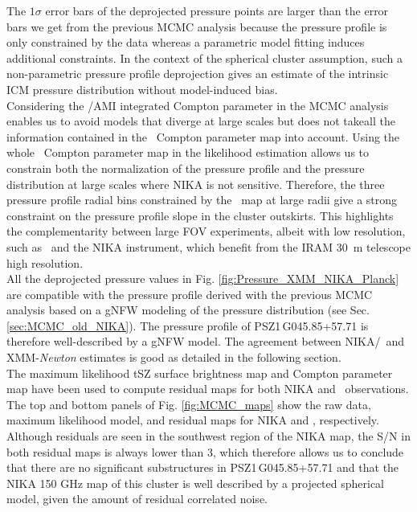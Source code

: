 \documentclass[traditabstract]{aa}
\begin{document}
\indent The $1\sigma$ error bars of the deprojected pressure points are larger than the error bars we get from the previous MCMC analysis because the pressure profile is only constrained by the data whereas a parametric model fitting induces additional constraints. In the context of the spherical cluster assumption, such a non-parametric pressure profile deprojection gives an estimate of the intrinsic ICM pressure distribution without model-induced bias.\\
\indent Considering the \planck/AMI integrated Compton parameter in the MCMC analysis enables us to avoid models that diverge at large scales but does not takeall the information contained in the \planck\ Compton parameter map  into account. Using the whole \planck\ Compton parameter map in the likelihood estimation allows us to constrain both the normalization of the pressure profile and the pressure distribution at large scales where NIKA is not sensitive. Therefore, the three pressure profile radial bins constrained by the \planck\ map at large radii give a strong constraint on the pressure profile slope in the cluster outskirts. This highlights the complementarity between large FOV experiments, albeit with low resolution, such as \planck\ and the NIKA instrument, which benefit from the IRAM 30~m telescope high resolution.\\
\indent All the deprojected pressure values in Fig. \ref{fig:Pressure_XMM_NIKA_Planck} are compatible with the pressure profile derived with the previous MCMC analysis based on a gNFW modeling of the pressure distribution (see Sec. \ref{sec:MCMC_old_NIKA}). The pressure profile of \mbox{PSZ1\,G045.85+57.71} is therefore well-described by a gNFW model. The agreement between NIKA/\planck\ and XMM-{\it Newton} estimates is good as detailed in the following section.\\
\indent The maximum likelihood tSZ surface brightness map and Compton parameter map have been used to compute residual maps for both NIKA and \planck\ observations.  The top and bottom panels of Fig. \ref{fig:MCMC_maps} show the raw data, maximum likelihood model, and residual maps for NIKA and \planck, respectively. Although residuals are seen in the southwest region of the NIKA map, the S/N in both residual maps is always lower than 3, which therefore allows us to conclude that there are no significant substructures in \mbox{PSZ1\,G045.85+57.71} and that the NIKA 150 GHz map of this cluster is well described by a projected spherical model, given the amount of residual correlated noise.
\end{document}
